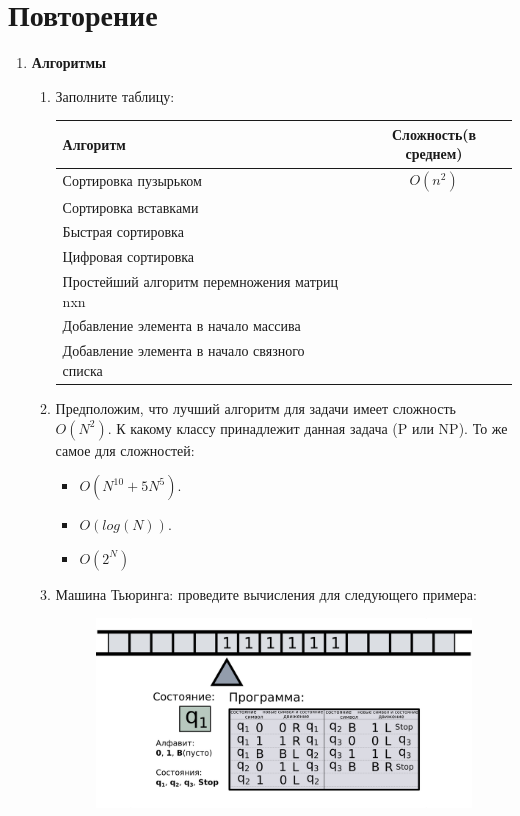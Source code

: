 \documentclass{article}
\begin{document}
\section*{Повторение}
\begin{enumerate}



\item \textbf{Алгоритмы}
\begin{enumerate}
\item Заполните таблицу:
\begin{center}
  \begin{tabular}{ l || c }
    \hline
    Алгоритм & Сложность(в среднем) \\ \hline \hline
    Сортировка пузырьком & $O(n^2)$  \\ \hline
    Сортировка вставками &   \\ \hline
    Быстрая сортировка &   \\ \hline
    Цифровая сортировка & \\ \hline
    Простейший алгоритм перемножения матриц nxn & \\ \hline
    Добавление элемента в начало массива & \\ \hline
    Добавление элемента в начало связного списка & \\ \hline
  \end{tabular}
\end{center}

\item Предположим, что лучший алгоритм для задачи имеет сложность $O(N^2)$. К какому классу принадлежит данная задача (P или NP). То же самое для сложностей:
\begin{multicols}{3}
\begin{itemize}
\item $O(N^{10} + 5 N^{5})$.
\item $O(log(N))$.
\item $O(2^N)$
\end{itemize}
\end{multicols}

\item Машина Тьюринга: проведите вычисления для следующего примера:
\begin{figure}[H]
\centerline{\includegraphics[width=0.7\linewidth]{tm.png}}
\end{figure}


\end{enumerate}
\end{enumerate}
\end{document}
